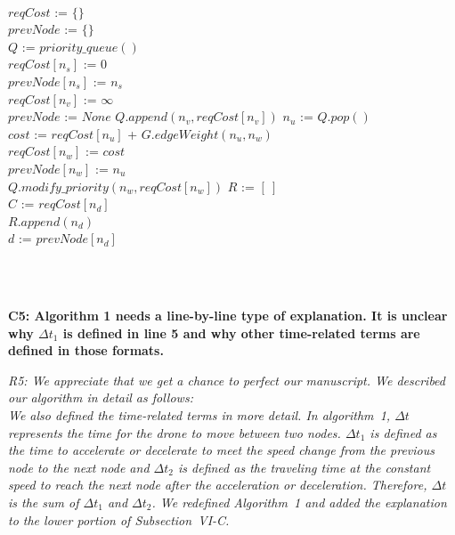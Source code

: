 \documentclass[onecolumn]{IEEEconf}
\let\oldnl\nl%
\newcommand{\nonl}{\renewcommand{\nl}{\let\nl\oldnl}}
\begin{document}
\begin{description}
\begin{algorithm}[h]
    \nonl \hrulefill \\
    $reqCost$ := $\{\}$  \\
    $prevNode$ := $\{\}$ \\
    $Q$ := $priority\_queue()$ \\
    $reqCost[n_s]$ := 0 \\
    $prevNode[n_s]$ := $n_s$ \\
    {
        {
            $reqCost[n_v]$ := $\infty$ \\
            $prevNode$ := $None$
        }
        $Q.append(n_v, reqCost[n_v])$
    }
    {
	    $n_u$ := $Q.pop()$ \\
        { 
    	    $cost$ := $reqCost[n_u]$ + $G.edgeWeight(n_u, n_w)$ \\
    	    {
    	        $reqCost[n_w]$ := $cost$ \\
    	        $prevNode[n_w]$ := $n_u$ \\
    	        $Q.modify\_priority(n_w, reqCost[n_w])$
    	    }
        }
    }
    $R$ := $[\ ]$ \\
    $C$ := $reqCost[n_d]$ \\ 
    {
    $R.append(n_d)$ \\
    $d$ := $prevNode[n_d]$
    }
    \end{algorithm}
    \SetNlSty{}{\color{black}}{:}
    \SetAlFnt{\color{black}}
    ~\\
    ~\\
    \item \textbf
    {
	C5: Algorithm 1 needs a line-by-line type of explanation. It is unclear why $\Delta t_1$ is defined in line 5 and why other time-related terms are defined in those formats.
	}
	\item \textit
	{
    R5: We appreciate that we get a chance to perfect our manuscript. We described our algorithm in detail as follows:\\
    We also defined the time-related terms in more detail. In algorithm~1, $\Delta t$ represents the time for the drone to move between two nodes. $\Delta t_1$ is defined as the time to accelerate or decelerate to meet the speed change from the previous node to the next node and $\Delta t_2$ is defined as the traveling time at the constant speed to reach the next node after the acceleration or deceleration. Therefore, $\Delta t$ is the sum of $\Delta t_1$ and $\Delta t_2$. We redefined Algorithm~1 and added the explanation to the lower portion of Subsection~VI-C.
}
\end{description}
\end{document}

